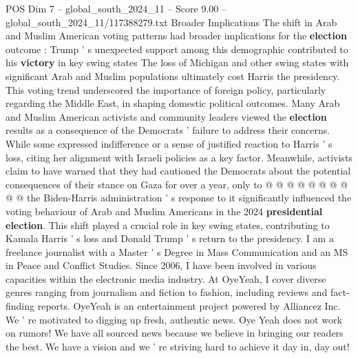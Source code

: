 \begin{textsample}{POS Dim 7 – global\_south\_2024\_11 – Score 9.00 – global\_south\_2024\_11/117388279.txt}
Broader Implications The shift in Arab and Muslim American voting patterns had broader implications for the \textbf{election} outcome : Trump ' s unexpected support among this demographic contributed to his \textbf{victory} in key swing states The loss of Michigan and other swing states with significant Arab and Muslim populations ultimately cost Harris the presidency.
This voting trend underscored the importance of foreign policy, particularly regarding the Middle East, in shaping domestic political outcomes.
Many Arab and Muslim American activists and community leaders viewed the \textbf{election} results as a consequence of the Democrats ' failure to address their concerns.
While some expressed indifference or a sense of justified reaction to Harris ' s loss, citing her alignment with Israeli policies as a key factor.
Meanwhile, activists claim to have warned that they had cautioned the Democrats about the potential consequences of their stance on Gaza for over a year, only to @ @ @ @ @ @ @ @ @ @ the Biden-Harris administration ' s response to it significantly influenced the voting behaviour of Arab and Muslim Americans in the 2024 \textbf{presidential} \textbf{election}.
This shift played a crucial role in key swing states, contributing to Kamala Harris ' s loss and Donald Trump ' s return to the presidency.
I am a freelance journalist with a Master ' s Degree in Mass Communication and an MS in Peace and Conflict Studies.
Since 2006, I have been involved in various capacities within the electronic media industry.
At OyeYeah, I cover diverse genres ranging from journalism and fiction to fashion, including reviews and fact-finding reports.
OyeYeah is an entertainment project powered by Alliancez Inc.
We ' re motivated to digging up fresh, authentic news.
Oye Yeah does not work on rumors!
We have all sourced news because we believe in bringing our readers the best.
We have a vision and we ' re striving hard to achieve it day in, day out!

\end{textsample}
